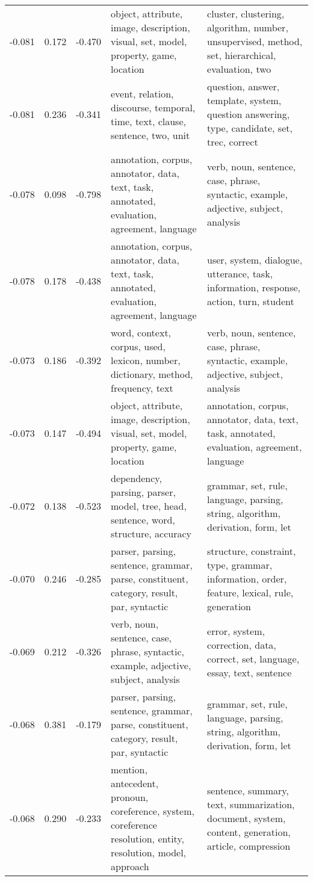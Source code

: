 \begin{tabular}{cccp{5cm}p{5cm}}
-0.081 & 0.172 & -0.470 & object, attribute, image, description, visual, set, model, property, game, location & cluster, clustering, algorithm, number, unsupervised, method, set, hierarchical, evaluation, two \\
-0.081 & 0.236 & -0.341 & event, relation, discourse, temporal, time, text, clause, sentence, two, unit & question, answer, template, system, question answering, type, candidate, set, trec, correct \\
-0.078 & 0.098 & -0.798 & annotation, corpus, annotator, data, text, task, annotated, evaluation, agreement, language & verb, noun, sentence, case, phrase, syntactic, example, adjective, subject, analysis \\
-0.078 & 0.178 & -0.438 & annotation, corpus, annotator, data, text, task, annotated, evaluation, agreement, language & user, system, dialogue, utterance, task, information, response, action, turn, student \\
-0.073 & 0.186 & -0.392 & word, context, corpus, used, lexicon, number, dictionary, method, frequency, text & verb, noun, sentence, case, phrase, syntactic, example, adjective, subject, analysis \\
-0.073 & 0.147 & -0.494 & object, attribute, image, description, visual, set, model, property, game, location & annotation, corpus, annotator, data, text, task, annotated, evaluation, agreement, language \\
-0.072 & 0.138 & -0.523 & dependency, parsing, parser, model, tree, head, sentence, word, structure, accuracy & grammar, set, rule, language, parsing, string, algorithm, derivation, form, let \\
-0.070 & 0.246 & -0.285 & parser, parsing, sentence, grammar, parse, constituent, category, result, par, syntactic & structure, constraint, type, grammar, information, order, feature, lexical, rule, generation \\
-0.069 & 0.212 & -0.326 & verb, noun, sentence, case, phrase, syntactic, example, adjective, subject, analysis & error, system, correction, data, correct, set, language, essay, text, sentence \\
-0.068 & 0.381 & -0.179 & parser, parsing, sentence, grammar, parse, constituent, category, result, par, syntactic & grammar, set, rule, language, parsing, string, algorithm, derivation, form, let \\
-0.068 & 0.290 & -0.233 & mention, antecedent, pronoun, coreference, system, coreference resolution, entity, resolution, model, approach & sentence, summary, text, summarization, document, system, content, generation, article, compression \\

\end{tabular}
